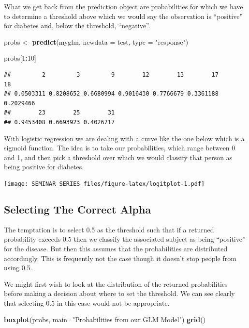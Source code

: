 \documentclass[]{book}
\newenvironment{Shaded}{\begin{snugshade}}{\end{snugshade}}
\newcommand{\KeywordTok}[1]{\textcolor[rgb]{0.13,0.29,0.53}{\textbf{#1}}}
\newcommand{\DataTypeTok}[1]{\textcolor[rgb]{0.13,0.29,0.53}{#1}}
\newcommand{\DecValTok}[1]{\textcolor[rgb]{0.00,0.00,0.81}{#1}}
\newcommand{\StringTok}[1]{\textcolor[rgb]{0.31,0.60,0.02}{#1}}
\newcommand{\OperatorTok}[1]{\textcolor[rgb]{0.81,0.36,0.00}{\textbf{#1}}}
\newcommand{\NormalTok}[1]{#1}
\begin{document}
What we get back from the prediction object are probabilities for which
we have to determine a threshold above which we would say the
observation is ``positive'' for diabetes and, below the threshold,
``negative''.

\begin{Shaded}
\begin{Highlighting}[]
\NormalTok{probs <-}\StringTok{ }\KeywordTok{predict}\NormalTok{(myglm,}
                 \DataTypeTok{newdata =}\NormalTok{ test,}
                 \DataTypeTok{type =} \StringTok{"response"}\NormalTok{)}

\NormalTok{probs[}\DecValTok{1}\OperatorTok{:}\DecValTok{10}\NormalTok{]}
\end{Highlighting}
\end{Shaded}

\begin{verbatim}
##         2         3         9        12        13        17        18 
## 0.0503311 0.8208652 0.6680994 0.9016430 0.7766679 0.3361188 0.2029466 
##        23        25        31 
## 0.9453408 0.6693923 0.4026717
\end{verbatim}

With logistic regression we are dealing with a curve like the one below
which is a sigmoid function. The idea is to take our probabilities,
which range between 0 and 1, and then pick a threshold over which we
would classify that person as being positive for diabetes.

\texttt{[image: SEMINAR\_SERIES\_files/figure-latex/logitplot-1.pdf]}

\subsection{Selecting The Correct
Alpha}\label{selecting-the-correct-alpha}

The temptation is to select 0.5 as the threshold such that if a returned
probability exceeds 0.5 then we classify the associated subject as being
``positive'' for the disease. But then this assumes that the
probabilities are distributed accordingly. This is frequently not the
case though it doesn't stop people from using 0.5.

We might first wish to look at the distribution of the returned
probabilities before making a decision about where to set the threshold.
We can see clearly that selecting 0.5 in this case would not be
appropriate.

\begin{Shaded}
\begin{Highlighting}[]
\KeywordTok{boxplot}\NormalTok{(probs, }
        \DataTypeTok{main=}\StringTok{"Probabilities from our GLM Model"}\NormalTok{)}
\KeywordTok{grid}\NormalTok{()}
\end{Highlighting}
\end{Shaded}
\end{document}
